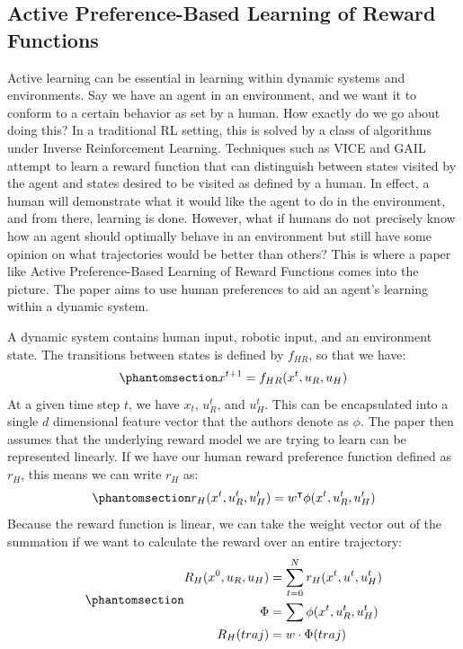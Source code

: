 \documentclass[
  letterpaper,
  numbers=noenddot,
  DIV=11]{scrreprt}
\theoremstyle{plain}
\theoremstyle{definition}
\theoremstyle{plain}
\theoremstyle{remark}
\begin{document}
\subsection{Active Preference-Based Learning of Reward
Functions}\label{active-preference-based-learning-of-reward-functions}

Active learning can be essential in learning within dynamic systems and
environments. Say we have an agent in an environment, and we want it to
conform to a certain behavior as set by a human. How exactly do we go
about doing this? In a traditional RL setting, this is solved by a class
of algorithms under Inverse Reinforcement Learning. Techniques such as
VICE and GAIL attempt to learn a reward function that can distinguish
between states visited by the agent and states desired to be visited as
defined by a human. In effect, a human will demonstrate what it would
like the agent to do in the environment, and from there, learning is
done. However, what if humans do not precisely know how an agent should
optimally behave in an environment but still have some opinion on what
trajectories would be better than others? This is where a paper like
Active Preference-Based Learning of Reward Functions comes into the
picture. The paper aims to use human preferences to aid an agent's
learning within a dynamic system.

A dynamic system contains human input, robotic input, and an environment
state. The transitions between states is defined by \(f_{HR}\), so that
we have:
\begin{equation}\phantomsection\label{eq-eq3.35}{x^{t+1} = f_{HR}(x^t, u_R, u_H)}\end{equation}
At a given time step \(t\), we have \(x_t\), \(u_R^t\), and \(u_H^t\).
This can be encapsulated into a single \(d\) dimensional feature vector
that the authors denote as \(\phi\). The paper then assumes that the
underlying reward model we are trying to learn can be represented
linearly. If we have our human reward preference function defined as
\(r_H\), this means we can write \(r_H\) as:
\begin{equation}\phantomsection\label{eq-eq3.35}{r_H(x^t, u_R^t, u_H^t) = w^{\intercal}\phi(x^t, u_R^t, u_H^t)}\end{equation}
Because the reward function is linear, we can take the weight vector out
of the summation if we want to calculate the reward over an entire
trajectory:
\begin{equation}\phantomsection\label{eq-eq3.36}{\begin{aligned}
R_{H}(x^0, u_R, u_H) &= \sum_{t=0}^{N} r_{H}(x^t, u^t, u_H^t)\\
\Phi &= \sum \phi(x^t, u_R^t, u_H^t)\\ 
R_H(traj) &= w\cdot\Phi(traj)\end{aligned}}\end{equation}
\end{document}
